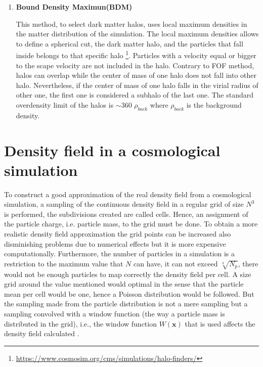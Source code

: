 \begin{enumerate}

\item \textbf{Bound Density Maximun(BDM)}

This method, to select dark matter halos, uses local maximum densities
in the matter distribution of the simulation.  
The local maximum densities allows to define a spherical cut, the dark matter halo, 
and the particles that fall inside belongs to that specific halo \footnote{\url{https://www.cosmosim.org/cms/simulations/halo-finders/}}. 
Particles with a velocity equal or bigger to the scape velocity are 
not included in the halo. 
Contrary to FOF method, halos can overlap while the center of mass of one halo 
does not fall into other halo. Nevertheless, if the center of mass of one halo
falls in the virial radius of other one, the first one is considered a subhalo of the last
one. The standard overdensity limit of the halos is $\sim 360$ $\rho_{back}$ where $\rho_{back}$
is the background density. 

\end{enumerate}

\section{Density field in a cosmological simulation}

To construct a good approximation of the real density field from a cosmological simulation, 
a sampling of the continuous density field in a regular grid of size $N^3$ is 
performed, the subdivisions created are called cells. Hence, an assignment of the 
particle charge, i.e. particle mass, to the grid must be done. To obtain a more realistic 
density field approximation the grid points can be increased also disminishing problems 
due to numerical effects but it is more expensive computationally. Furthermore, the number 
of particles in a simulation is a restriction to the maximum value that $N$ can have, 
it can not exceed $\sqrt[3]{N_p}$, there would not be enough particles to map correctly 
the density field per cell. A size grid around the value mentioned would optimal in 
the sense that the particle mean per cell would be one, hence a Poisson distribution 
would be followed. But the sampling made from the particle distribution is not a 
mere sampling but a sampling convolved with a window function (the way a particle 
mass is distributed in the grid), i.e., the window function $W(\textbf{x})$ that is used affects 
the density field calculated \cite{bosch}. 


